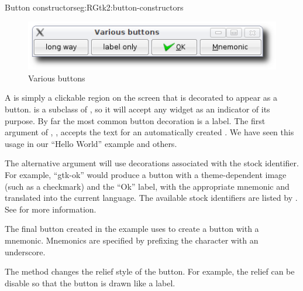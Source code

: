 \begin{example}{Button constructors}{eg:RGtk2:button-constructors}
\begin{Schunk}
\end{Schunk}
\end{example}

\begin{figure}
  \centering
  \includegraphics[width=.8\textwidth]{RGtk2-various-button}
  \caption{Various buttons}
  \label{fig:RGtk2:various-buttons}
\end{figure}

A  is simply a clickable region on the screen that is
decorated to appear as a button.  is a subclass of
, so it will accept any widget as an indicator of its
purpose. By far the most common button decoration is a label. The
first argument of ,
, accepts the text for an automatically
created . We have seen this usage in our ``Hello
World'' example and others.

The alternative  argument will use
decorations associated with the stock identifier. For example,
``gtk-ok'' would produce a button with a theme-dependent image (such
as a checkmark) and the ``Ok'' label, with the appropriate mnemonic
and translated into the current language.  The available stock
identifiers are listed by . See
 for more information.

The final button created in the example uses
 to create a button with a
mnemonic. Mnemonics are specified by prefixing the character with an
underscore.

The method  changes the relief style of
the button. For example, the relief can be disable so that the button
is drawn like a label.

